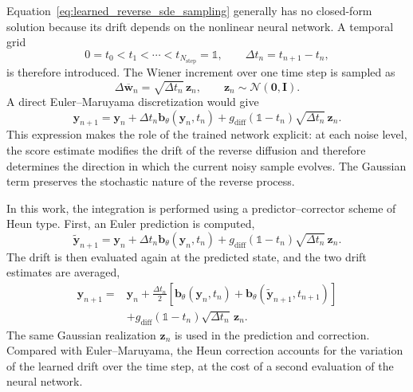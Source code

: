 Equation~\eqref{eq:learned_reverse_sde_sampling} generally has no closed-form
solution because its drift depends on the nonlinear neural network. A temporal
grid
\begin{equation}
    0=t_0<t_1<\cdots<t_{N_{\mathrm{step}}}=\mathds{1},
    \qquad
    \Delta t_n=t_{n+1}-t_n,
\end{equation}
is therefore introduced. The Wiener increment over one time step is sampled as
\begin{equation}
    \Delta\overline{\mathbf{w}}_n
    =
    \sqrt{\Delta t_n}\,\mathbf{z}_n,
    \qquad
    \mathbf{z}_n\sim\mathcal{N}(\mathbf{0},\mathbf{I}).
\end{equation}
A direct Euler--Maruyama discretization would give
\begin{equation}
    \mathbf{y}_{n+1}
    =
    \mathbf{y}_n
    +\Delta t_n\mathbf{b}_{\theta}(\mathbf{y}_n,t_n)
    +g_{\mathrm{diff}}(\mathds{1}-t_n)\sqrt{\Delta t_n}\,\mathbf{z}_n.
    \label{eq:euler_maruyama_sampling}
\end{equation}
This expression makes the role of the trained network explicit: at each noise
level, the score estimate modifies the drift of the reverse diffusion and
therefore determines the direction in which the current noisy sample evolves.
The Gaussian term preserves the stochastic nature of the reverse process.

In this work, the integration is performed using a predictor--corrector scheme
of Heun type. First, an Euler prediction is computed,
\begin{equation}
    \widetilde{\mathbf{y}}_{n+1}
    =
    \mathbf{y}_n
    +\Delta t_n\mathbf{b}_{\theta}(\mathbf{y}_n,t_n)
    +g_{\mathrm{diff}}(\mathds{1}-t_n)\sqrt{\Delta t_n}\,\mathbf{z}_n.
    \label{eq:heun_sampling_predictor}
\end{equation}
The drift is then evaluated again at the predicted state, and the two drift
estimates are averaged,
\begin{equation}
\begin{aligned}
    \mathbf{y}_{n+1}
    ={}&
    \mathbf{y}_n
    +\frac{\Delta t_n}{2}
    \left[
        \mathbf{b}_{\theta}(\mathbf{y}_n,t_n)
        +
        \mathbf{b}_{\theta}
        (\widetilde{\mathbf{y}}_{n+1},t_{n+1})
    \right]
    \\
    &+
    g_{\mathrm{diff}}(\mathds{1}-t_n)\sqrt{\Delta t_n}\,\mathbf{z}_n.
    \label{eq:heun_sampling_corrector}
\end{aligned}
\end{equation}
The same Gaussian realization $\mathbf{z}_n$ is used in the prediction and
correction. Compared with Euler--Maruyama, the Heun correction accounts for the
variation of the learned drift over the time step, at the cost of a second
evaluation of the neural network.


